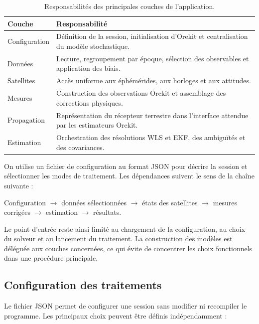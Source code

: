 \begin{table}[H]
\centering
\caption{Responsabilités des principales couches de l'application.}
\label{tab:software_packages}
\small
\begin{tabularx}{\textwidth}{p{3.2cm} X}
\hline
\textbf{Couche} & \textbf{Responsabilité} \\
\hline
Configuration & Définition de la session, initialisation d'Orekit et
centralisation du modèle stochastique. \\
Données & Lecture, regroupement par époque, sélection des observables et
application des biais. \\
Satellites & Accès uniforme aux éphémérides, aux horloges et aux attitudes. \\
Mesures & Construction des observations Orekit et assemblage des corrections
physiques. \\
Propagation & Représentation du récepteur terrestre dans l'interface attendue
par les estimateurs Orekit. \\
Estimation & Orchestration des résolutions WLS et EKF, des ambiguïtés et des
covariances. \\
\hline
\end{tabularx}
\end{table}

On utilise un fichier de configuration au format JSON pour décrire la session
et sélectionner les modes de traitement. Les dépendances suivent le sens de la
chaîne suivante :

\begin{center}
\small
Configuration
$\longrightarrow$ données sélectionnées
$\longrightarrow$ états des satellites
$\longrightarrow$ mesures corrigées
$\longrightarrow$ estimation
$\longrightarrow$ résultats.
\end{center}

Le point d'entrée reste ainsi limité au chargement de la configuration, au
choix du solveur et au lancement du traitement. La construction des modèles
est déléguée aux couches concernées, ce qui évite de concentrer les choix
fonctionnels dans une procédure principale.

\subsection{Configuration des traitements}

Le fichier JSON permet de configurer une session sans modifier ni recompiler
le programme. Les principaux choix peuvent être définis indépendamment :

